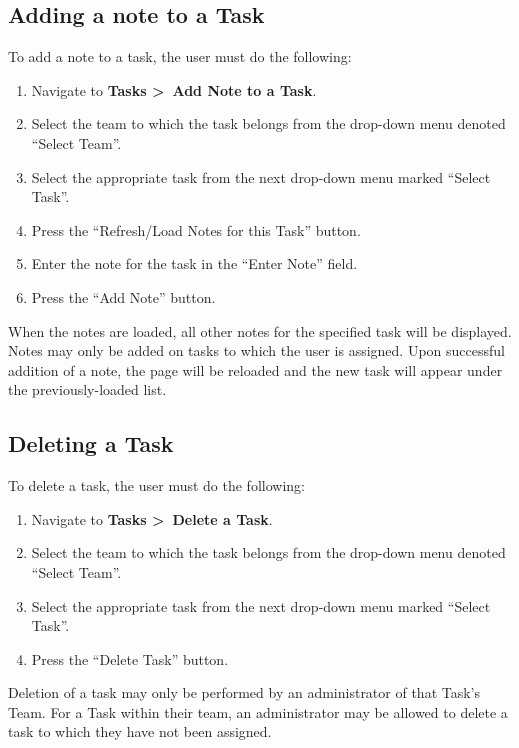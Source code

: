 \documentclass[12pt]{article}
\begin{document}
\subsection{Adding a note to a Task}
To add a note to a task, the user must do the following:
\begin{enumerate}
  \item Navigate to \textbf{Tasks \textgreater~Add Note to a Task}.
  \item Select the team to which the task belongs from the drop-down menu denoted ``Select Team''.
  \item Select the appropriate task from the next drop-down menu marked ``Select Task''.
  \item Press the ``Refresh/Load Notes for this Task'' button.
  \item Enter the note for the task in the ``Enter Note'' field.
  \item Press the ``Add Note'' button.
\end{enumerate}
When the notes are loaded, all other notes for the specified task will be displayed.  Notes may only be added on tasks to which the user is assigned.  Upon successful addition of a note, the page will be reloaded and the new task will appear under the previously-loaded list.
\subsection{Deleting a Task}
To delete a task, the user must do the following:
\begin{enumerate}
  \item Navigate to \textbf{Tasks \textgreater~Delete a Task}.
  \item Select the team to which the task belongs from the drop-down menu denoted ``Select Team''.
  \item Select the appropriate task from the next drop-down menu marked ``Select Task''.
  \item Press the ``Delete Task'' button.
\end{enumerate}
Deletion of a task may only be performed by an administrator of that Task's Team.  For a Task within their team, an administrator may be allowed to delete a task to which they have not been assigned.
\end{document}
